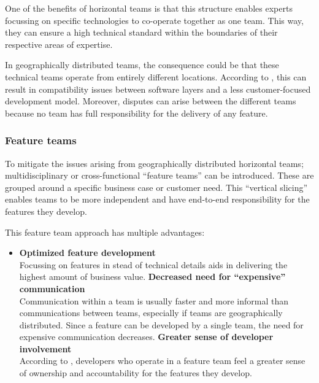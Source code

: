 One of the benefits of horizontal teams is that this structure enables experts
focussing on specific technologies to co-operate together as one team. This way,
they can ensure a high technical standard within the boundaries of their
respective areas of expertise.

In geographically distributed teams, the consequence could be that these
technical teams operate from entirely different locations. According to
\textcite{Smite_etal_2010}, this can result in compatibility issues between software
layers and a less customer-focused development model. Moreover, disputes can
arise between the different teams because no team has full responsibility for
the delivery of any feature.

\subsubsection{Feature teams}
\label{feature-teams}


To mitigate the issues arising from geographically distributed horizontal teams;
multidisciplinary or cross-functional ``feature teams'' can be introduced. These
are grouped around a specific business case or customer need. This ``vertical
slicing''  enables teams to be more independent and have end-to-end
responsibility for the features they develop.

This feature team approach has multiple advantages: \autocite{Smite_etal_2010}
\begin{itemize} 
  \item \textbf{Optimized feature development}\\
  Focussing on features in stead of technical details aids in delivering the
  highest amount of business value.
  \spacedItem \textbf{Decreased need for ``expensive'' communication}\\
  Communication within a team is usually faster and more informal than
  communications between teams, especially if teams are geographically
  distributed. Since a feature can be developed by a single team, the need for
  expensive communication decreases.
  \spacedItem \textbf{Greater sense of developer involvement}\\
  According to \autocite{LarmanVodde_2008}, developers who operate in a feature
  team feel a greater sense of ownership and accountability for the features
  they develop. 
\end{itemize}

